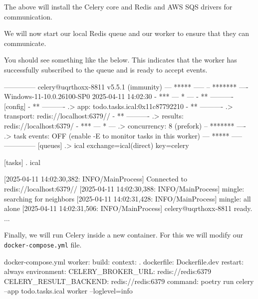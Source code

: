 \documentclass{csse4400}
\begin{document}

\noindent
The above will install the Celery core and Redis and AWS SQS drivers for communication.

We will now start our local Redis queue and our worker to ensure that they can communicate.



You should see something like the below.
This indicates that the worker has successfully subscribed to the queue and is ready to accept events.
%
\begin{code}[numbers=none]{}
 -------------- celery@uqrthoxx-8811 v5.5.1 (immunity)
--- ***** -----
-- ******* ---- Windows-11-10.0.26100-SP0 2025-04-11 14:02:30
- *** --- * ---
- ** ---------- [config]
- ** ---------- .> app:         todo.tasks.ical:0x11c87792210
- ** ---------- .> transport:   redis://localhost:6379//
- ** ---------- .> results:     redis://localhost:6379/
- *** --- * --- .> concurrency: 8 (prefork)
-- ******* ---- .> task events: OFF (enable -E to monitor tasks in this worker)
--- ***** -----
 -------------- [queues]
                .> ical             exchange=ical(direct) key=celery


[tasks]
  . ical

[2025-04-11 14:02:30,382: INFO/MainProcess] Connected to redis://localhost:6379//
[2025-04-11 14:02:30,388: INFO/MainProcess] mingle: searching for neighbors
[2025-04-11 14:02:31,428: INFO/MainProcess] mingle: all alone
[2025-04-11 14:02:31,506: INFO/MainProcess] celery@uqrthoxx-8811 ready.
...
\end{code}

Finally, we will run Celery inside a new container.
For this we will modify our \texttt{docker-compose.yml} file.
%
\begin{code}[numbers=none]{docker-compose.yml}
  worker:
    build:
      context: .
      dockerfile: Dockerfile.dev
    restart: always
    environment:
      CELERY_BROKER_URL: redis://redis:6379
      CELERY_RESULT_BACKEND: redis://redis:6379
    command: poetry run celery --app todo.tasks.ical worker --loglevel=info
\end{code}
\end{document}
